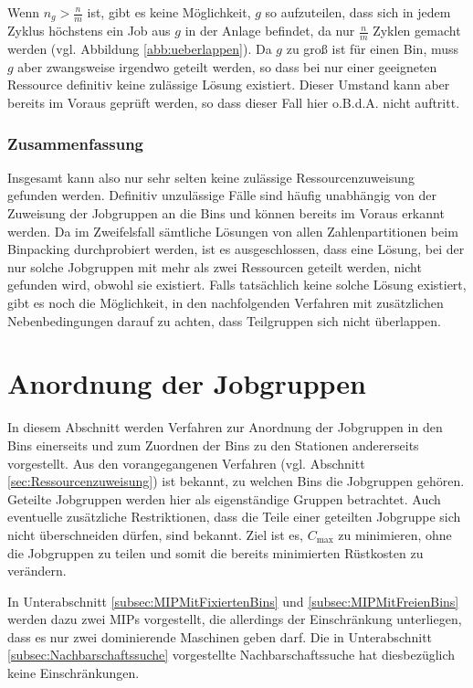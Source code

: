 \documentclass{scrreprt}
\begin{document}
Wenn $n_g > \frac{n}{m}$ ist,
gibt es keine Möglichkeit, $g$ so aufzuteilen, 
dass sich in jedem Zyklus höchstens ein Job aus $g$ in der Anlage befindet,
da nur $\frac{n}{m}$ Zyklen gemacht werden (vgl. Abbildung \ref{abb:ueberlappen}).
Da $g$ zu groß ist für einen Bin, muss $g$ aber zwangsweise irgendwo geteilt werden, so dass bei nur einer geeigneten Ressource definitiv keine zulässige Lösung existiert.
Dieser Umstand kann aber bereits im Voraus geprüft werden, so dass dieser Fall hier o.B.d.A. nicht auftritt.

\subsubsection{Zusammenfassung}
Insgesamt kann also nur sehr selten keine zulässige Ressourcenzuweisung gefunden werden.
Definitiv unzulässige Fälle sind häufig unabhängig von der Zuweisung der Jobgruppen an die Bins und können bereits im Voraus erkannt werden.
Da im Zweifelsfall sämtliche Lösungen von allen Zahlenpartitionen beim Binpacking durchprobiert werden, ist es ausgeschlossen, dass eine Lösung,
bei der nur solche Jobgruppen mit mehr als zwei Ressourcen geteilt werden, nicht gefunden wird, obwohl sie existiert.
Falls tatsächlich keine solche Lösung existiert, gibt es noch die Möglichkeit, in den nachfolgenden Verfahren mit zusätzlichen Nebenbedingungen darauf zu achten,
dass Teilgruppen sich nicht überlappen.


\section{Anordnung der Jobgruppen}
\label{sec:AnordnungDerJobgruppen}
In diesem Abschnitt werden Verfahren zur Anordnung der Jobgruppen in den Bins einerseits und
zum Zuordnen der Bins zu den Stationen andererseits vorgestellt.
Aus den vorangegangenen Verfahren (vgl. Abschnitt \ref{sec:Ressourcenzuweisung}) ist bekannt, zu welchen Bins die Jobgruppen gehören.
Geteilte Jobgruppen werden hier als eigenständige Gruppen betrachtet.
Auch eventuelle zusätzliche Restriktionen, dass die Teile einer geteilten Jobgruppe sich nicht überschneiden dürfen, sind bekannt.
Ziel ist es, $C_{\max}$ zu minimieren, ohne die Jobgruppen zu teilen und somit die bereits minimierten Rüstkosten zu verändern.

In Unterabschnitt \ref{subsec:MIPMitFixiertenBins} und \ref{subsec:MIPMitFreienBins} werden dazu zwei MIPs vorgestellt,
die allerdings der Einschränkung unterliegen, dass es nur zwei dominierende Maschinen geben darf.
Die in Unterabschnitt \ref{subsec:Nachbarschaftssuche} vorgestellte Nachbarschaftssuche hat diesbezüglich keine Einschränkungen.
\end{document}
